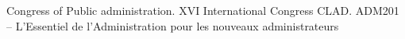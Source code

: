 
\begin{scholarship}
			{Congress of Public administration. XVI International Congress CLAD.}
			{ADM201 – L’Essentiel de l’Administration pour les nouveaux administrateurs}
\end{scholarship}